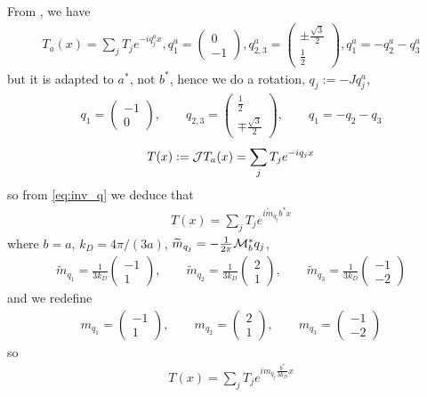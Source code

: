 \documentclass[11pt,a4paper,reqno,french,tikz]{amsart}
\newcommand{\f}[2]{\frac{#1}{#2}} %
\newcommand{\mat}[1]{\begin{pmatrix} #1 \end{pmatrix}} %
\begin{document}
From \cite{TarKruVis19}, we have
\begin{align*}
T_a(x) = \sum_j T_j e^{-iq_j^a x}, q^a_1 = \mat{0 \\ -1}, q^a_{2,3} = \mat{\pm\f{\sqrt 3}{2} \\ \f{1}{2}}, q^a_1 = -q^a_2 - q^a_3
\end{align*}
but it is adapted to $a^*$, not $b^*$, hence we do a rotation, $q_j := -J q^a_j$,
\begin{align*}
q_1 = \mat{-1 \\ 0}, \qquad q_{2,3} = \mat{\f 12 \\ \mp \f{\sqrt 3}{2} }, \qquad  q_1 = -q_2 - q_3
\end{align*}
\begin{align*}
T(x) := \mathcal{J} T_a(x) = \sum_j T_j e^{-iq_j x}
\end{align*}
so from \eqref{eq:inv_q} we deduce that
\begin{align*}
T(x) = \sum_j T_j e^{i\widetilde{m}_{q_j} b^* x}
\end{align*}
where $b=a$, $k_D = 4\pi/(3a)$, $\widetilde{m}_{q_j} = -\f{1}{2\pi} \cM_b^* q_j$,
\begin{align*}
\widetilde{m}_{q_1} = \f{1}{3k_D} \mat{-1 \\ 1}, \qquad \widetilde{m}_{q_2} = \f{1}{3k_D} \mat{2 \\ 1}, \qquad \widetilde{m}_{q_3} =  \f{1}{3k_D} \mat{-1 \\ -2}
\end{align*}
and we redefine
\begin{align*}
m_{q_1} =  \mat{-1 \\ 1}, \qquad m_{q_2} =  \mat{2 \\ 1}, \qquad m_{q_3} =   \mat{-1 \\ -2}
\end{align*}
so
\begin{align*}
T(x) = \sum_j T_j e^{i m_{q_j} \f{b^*}{3k_D} x}
\end{align*}
\end{document}
